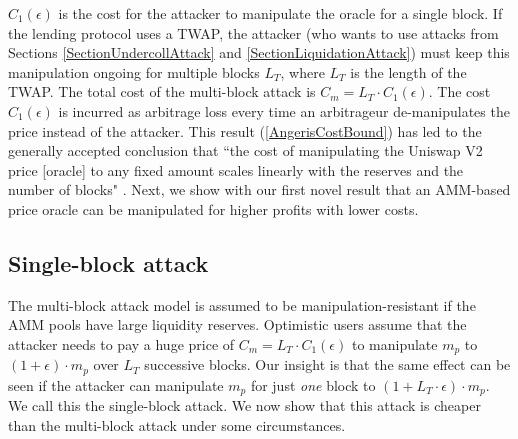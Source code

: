 $C_1(\epsilon)$ is the cost for the attacker to manipulate the oracle for a single block. If the lending protocol uses a TWAP, the attacker (who wants to use attacks from Sections \ref{SectionUndercollAttack} and \ref{SectionLiquidationAttack}) must keep this manipulation ongoing for multiple blocks $L_T$, where $L_T$ is the length of the TWAP. The total cost of the multi-block attack is $C_m = L_T \cdot C_1(\epsilon)$. The cost $C_1(\epsilon)$ is incurred as arbitrage loss every time an arbitrageur de-manipulates the price instead of the attacker. This result (\ref{AngerisCostBound}) has led to the generally accepted conclusion that ``the cost of manipulating the Uniswap V2 price [oracle] to any fixed amount scales linearly with the reserves and the number of blocks" \cite{AngerisMedium}. Next, we show with our first novel result that an AMM-based price oracle can be manipulated for higher profits with lower costs.

\subsection{Single-block attack}
The multi-block attack model is assumed to be manipulation-resistant if the AMM pools have large liquidity reserves. Optimistic users assume that the attacker needs to pay a huge price of $C_m = L_T \cdot C_1(\epsilon)$ to manipulate $m_p$ to $(1+\epsilon)\cdot m_p$ over $L_T$ successive blocks. Our insight is that the same effect can be seen if the attacker can manipulate $m_p$ for just \textit{one} block to $(1 + L_T \cdot \epsilon) \cdot m_p$. We call this the single-block attack. We now show that this attack is cheaper than the multi-block attack under some circumstances.

